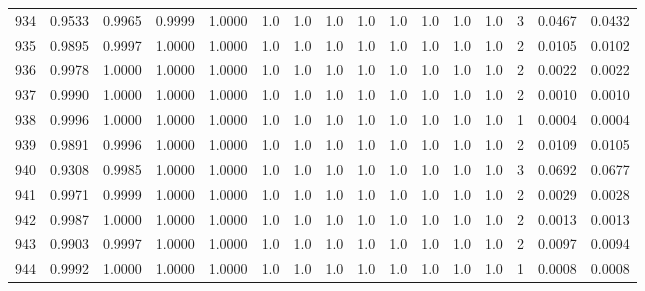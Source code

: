\begin{tabular}{lrrrrrrrrrrrrrrr}
934 &      0.9533 &  0.9965 &  0.9999 &  1.0000 &     1.0 &     1.0 &     1.0 &     1.0 &     1.0 &     1.0 &      1.0 &        1.0 &      3 &                    0.0467 &                     0.0432 \\
935 &      0.9895 &  0.9997 &  1.0000 &  1.0000 &     1.0 &     1.0 &     1.0 &     1.0 &     1.0 &     1.0 &      1.0 &        1.0 &      2 &                    0.0105 &                     0.0102 \\
936 &      0.9978 &  1.0000 &  1.0000 &  1.0000 &     1.0 &     1.0 &     1.0 &     1.0 &     1.0 &     1.0 &      1.0 &        1.0 &      2 &                    0.0022 &                     0.0022 \\
937 &      0.9990 &  1.0000 &  1.0000 &  1.0000 &     1.0 &     1.0 &     1.0 &     1.0 &     1.0 &     1.0 &      1.0 &        1.0 &      2 &                    0.0010 &                     0.0010 \\
938 &      0.9996 &  1.0000 &  1.0000 &  1.0000 &     1.0 &     1.0 &     1.0 &     1.0 &     1.0 &     1.0 &      1.0 &        1.0 &      1 &                    0.0004 &                     0.0004 \\
939 &      0.9891 &  0.9996 &  1.0000 &  1.0000 &     1.0 &     1.0 &     1.0 &     1.0 &     1.0 &     1.0 &      1.0 &        1.0 &      2 &                    0.0109 &                     0.0105 \\
940 &      0.9308 &  0.9985 &  1.0000 &  1.0000 &     1.0 &     1.0 &     1.0 &     1.0 &     1.0 &     1.0 &      1.0 &        1.0 &      3 &                    0.0692 &                     0.0677 \\
941 &      0.9971 &  0.9999 &  1.0000 &  1.0000 &     1.0 &     1.0 &     1.0 &     1.0 &     1.0 &     1.0 &      1.0 &        1.0 &      2 &                    0.0029 &                     0.0028 \\
942 &      0.9987 &  1.0000 &  1.0000 &  1.0000 &     1.0 &     1.0 &     1.0 &     1.0 &     1.0 &     1.0 &      1.0 &        1.0 &      2 &                    0.0013 &                     0.0013 \\
943 &      0.9903 &  0.9997 &  1.0000 &  1.0000 &     1.0 &     1.0 &     1.0 &     1.0 &     1.0 &     1.0 &      1.0 &        1.0 &      2 &                    0.0097 &                     0.0094 \\
944 &      0.9992 &  1.0000 &  1.0000 &  1.0000 &     1.0 &     1.0 &     1.0 &     1.0 &     1.0 &     1.0 &      1.0 &        1.0 &      1 &                    0.0008 &                     0.0008 \\

\end{tabular}
